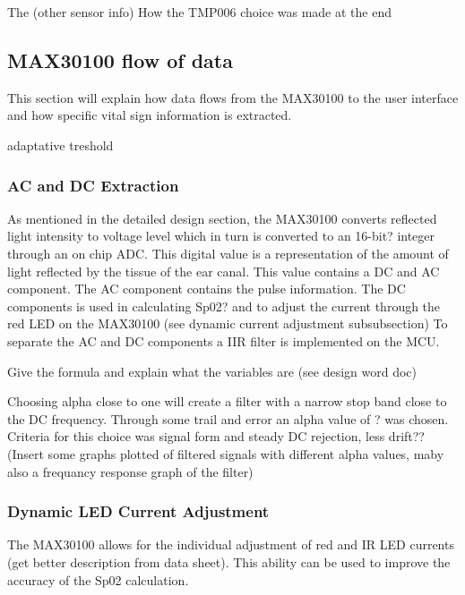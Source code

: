 The (other sensor info)
How the TMP006 choice was made at the end















\subsection{MAX30100 flow of data}
This section will explain how data flows from the MAX30100 to the user interface and how specific vital sign information is extracted.

adaptative treshold

\subsubsection{AC and DC Extraction}
As mentioned in the detailed design section, the MAX30100 converts reflected light intensity to voltage level which in turn is converted to an 16-bit? integer through an on chip ADC. This digital value is a representation of the amount of light reflected by the tissue of the ear canal. This value contains a DC and AC component. The AC component contains the pulse information. The DC components is used in calculating Sp02? and to adjust the current through the red LED on the MAX30100 (see dynamic current adjustment subsubsection) To separate the AC and DC components a IIR filter is implemented on the MCU.

Give the formula and explain what the variables are (see design word doc)

Choosing alpha close to one will create a filter with a narrow stop band close to the DC frequency. Through some trail and error an alpha value of ? was chosen. Criteria for this choice was signal form and steady DC rejection, less drift?? (Insert some graphs plotted of filtered signals with different alpha values, maby also a frequancy response graph of the filter)

\subsubsection{Dynamic LED Current Adjustment}
The MAX30100 allows for the individual adjustment of red and IR LED currents (get better description from data sheet). This ability can be used to improve the accuracy of the Sp02 calculation. 


